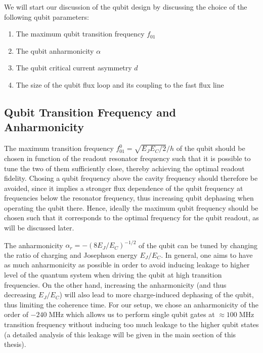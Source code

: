 We will start our discussion of the qubit design by discussing the choice of the following qubit parameters:

\begin{enumerate}
\item The maximum qubit transition frequency $f_{01}$
\item The qubit anharmonicity $\alpha$
\item The qubit critical current asymmetry $d$
\item The size of the qubit flux loop and its coupling to the fast flux line
\end{enumerate}

\subsection{Qubit Transition Frequency and Anharmonicity}

The maximum transition frequency $f_{01}^0 = \sqrt{E_J E_C/2}/h$  of the qubit should be chosen in function of the readout resonator frequency such that it is possible to tune the two of them sufficiently close, thereby achieving the optimal readout fidelity. Chosing a qubit frequency above the cavity frequency should therefore be avoided, since it implies a stronger flux dependence of the qubit frequency at frequencies below the resonator frequency, thus increasing qubit dephasing when operating the qubit there. Hence, ideally the maximum qubit frequency should be chosen such that it corresponds to the optimal frequency for the qubit readout, as will be discussed later.

\smallskip

The anharmonicity $\alpha_r=-(8E_J/E_C)^{-1/2}$ of the qubit can be tuned by changing the ratio of charging and Josephson energy $E_J/E_C$. In general, one aims to have as much anharmonicity as possible in order to avoid inducing leakage to higher level of the quantum system when driving the qubit at high transition frequencies. On the other hand, increasing the anharmonicity (and thus decreasing $E_J/E_C$) will also lead to more charge-induced dephasing of the qubit, thus limiting the coherence time. For our setup, we chose an anharmonicity of the order of $-240\;\mathrm{MHz}$ which allows us to perform single qubit gates at $\approx 100 \;\mathrm{MHz}$ transition frequency without inducing too much leakage to the higher qubit states (a detailed analysis of this leakage will be given in the main section of this thesis). 

